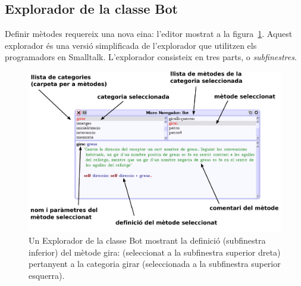 \subsection{\textsf{Explorador de la classe Bot}}
Definir mètodes requereix una nova eina: l'editor mostrat a la figura~\ref{fig1201}. Aquest explorador és una versió simplificada de l'explorador que utilitzen els programadors en Smalltalk. L'explorador consisteix en tres parts, o \emph{subfinestres}.
\begin{figure}[h!]
\begin{center}
\includegraphics[scale=0.55]{Imatges/figura12-1.pdf}
\end{center}
\caption{Un \textsf{\upshape Explorador de la classe Bot} mostrant la definició (subfinestra inferior) del mètode \textsf{\upshape gira:} (seleccionat a la subfinestra superior dreta) pertanyent a la categoria \textsf{\upshape girar} (seleccionada a la subfinestra superior esquerra).}
\label{fig1201}
\end{figure}
